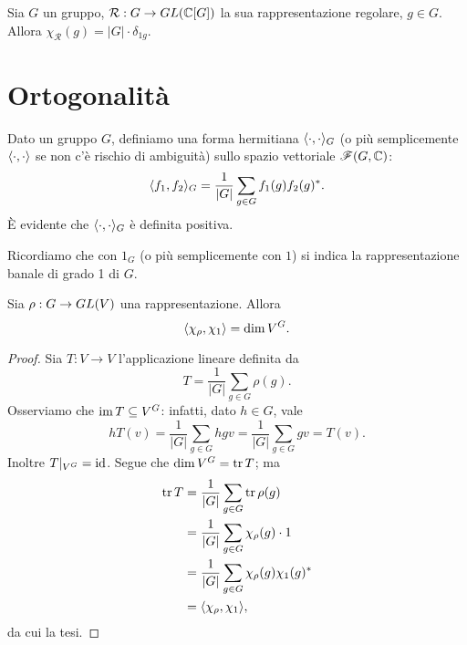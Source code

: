 \begin{corollary}
Sia $G$ un gruppo, $\mathcal{R}:G\to GL(\mathbb{C}[G])$ la sua rappresentazione regolare, $g\in G$. Allora $\chi_\mathcal{R}(g)=|G|\cdot\delta_{1g}$.
\end{corollary}

\section{Ortogonalità}

Dato un gruppo $G$, definiamo una forma hermitiana $\langle\cdot,\cdot\rangle_G$ (o più semplicemente $\langle\cdot,\cdot\rangle$ se non c'è rischio di ambiguità) sullo spazio vettoriale $\mathscr{F}(G,\mathbb{C})$:
$$
\langle f_1,f_2\rangle_G=\frac{1}{|G|}\sum_{g\in G}f_1(g)f_2(g)^*.
$$
È evidente che $\langle\cdot,\cdot\rangle_G$ è definita positiva.

Ricordiamo che con $1_G$ (o più semplicemente con $1$) si indica la rappresentazione banale di grado 1 di $G$.

\begin{lemma}
Sia $\rho:G\to GL(V)$ una rappresentazione. Allora
$$
\langle\chi_\rho,\chi_1\rangle=\dim V^G.
$$
\end{lemma}
\begin{proof}
Sia $T:V\to V$ l'applicazione lineare definita da
$$
T=\frac{1}{|G|}\sum_{g\in G}\rho(g).
$$
Osserviamo che $\operatorname{im} T\subseteq V^G$: infatti, dato $h\in G$, vale
$$
hT(v)=\frac{1}{|G|}\sum_{g\in G}hgv=\frac{1}{|G|}\sum_{g\in G}gv=T(v).
$$
Inoltre $T|_{V^G}=\operatorname{id}$. Segue che $\dim V^G=\operatorname{tr} T$; ma
\begin{align*}
\operatorname{tr} T&=\frac{1}{|G|}\sum_{g\in G}\operatorname{tr}\rho(g)\\
&=\frac{1}{|G|}\sum_{g\in G}\chi_\rho(g)\cdot1\\
&=\frac{1}{|G|}\sum_{g\in G}\chi_\rho(g)\chi_1(g)^*\\
&=\langle\chi_\rho,\chi_1\rangle,
\end{align*}
da cui la tesi.
\end{proof}

